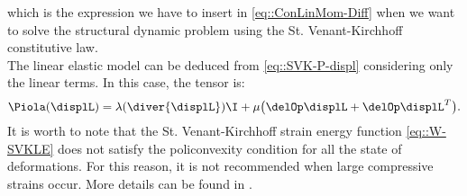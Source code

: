 which is the expression we have to insert in \eqref{eq::ConLinMom-Diff} when we want to solve the structural dynamic problem using the St. Venant-Kirchhoff constitutive law.\\
The linear elastic model can be deduced from \eqref{eq::SVK-P-displ} considering only the linear terms. In this case, the tensor \Piola is:
\begin{equation}
\Piola(\displL) = \lambda(\diver{\displL})\I + \mu\big(\delOp\displL + \delOp\displL^T\big).
\label{eq::LE-P}
\end{equation}
It is worth to note that the St. Venant-Kirchhoff strain energy function \eqref{eq::W-SVKLE} does not satisfy the policonvexity condition for all the state of deformations. For this reason, it is not recommended when large compressive strains occur. More details can be found in \cite{Hozapfel}.


